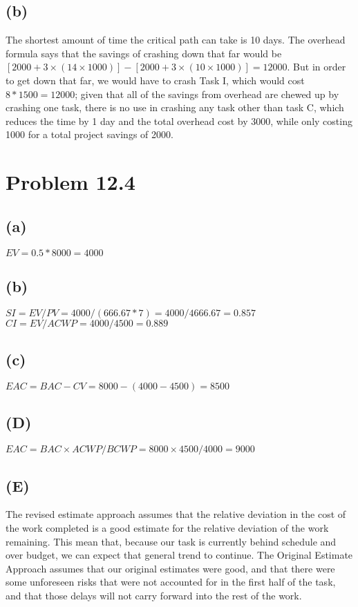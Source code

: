 \documentclass{article}
\begin{document}
		\subsection*{(b)}
		The shortest amount of time the critical path can take is 10 days. The overhead formula says that the savings of crashing down that far would be $[2000 + 3 \times (14 \times 1000)] - [2000 + 3 \times ( 10 \times 1000)] = 12000$. But in order to get down that far, we would have to crash Task I, which would cost $8 * 1500 = 12000$; given that all of the savings from overhead are chewed up by crashing one task, there is no use in crashing any task other than task C, which reduces the time by 1 day and the total overhead cost by 3000, while only costing 1000 for a total project savings of 2000.
	\section*{Problem 12.4}
	\subsection*{(a)}
	$EV = 0.5 * 8000 = 4000$
	\subsection*{(b)}
	$SI = EV/PV = 4000/(666.67*7) = 4000/4666.67 = 0.857$\\
	$CI = EV/ACWP = 4000/4500 = 0.889$
	\subsection*{(c)}
	$EAC = BAC - CV = 8000 - (4000 - 4500) = 8500$\\
	\subsection*{(D)}
	$EAC = BAC \times ACWP/BCWP = 8000 \times 4500/4000 = 9000$
	\subsection*{(E)}
	The revised estimate approach assumes that the relative deviation in the cost of the work completed is a good estimate for the relative deviation of the work remaining. This mean that, because our task is currently behind schedule and over budget, we can expect that general trend to continue. The Original Estimate Approach assumes that our original estimates were good, and that there were some unforeseen risks that were not accounted for in the first half of the task, and that those delays will not carry forward into the rest of the work.
\end{document}
